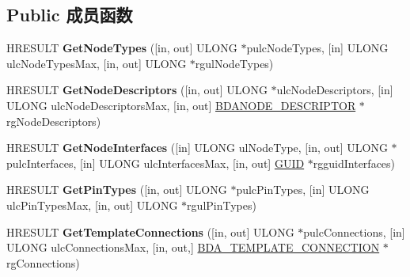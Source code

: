 \subsection*{Public 成员函数}
\begin{DoxyCompactItemize}
\item 
\mbox{\label{interface_i_b_d_a___topology_ac6b2f2dc7c8c6d2a32f9de649b10e5ca}} 
H\+R\+E\+S\+U\+LT {\bfseries Get\+Node\+Types} (\mbox{[}in, out\mbox{]} U\+L\+O\+NG $\ast$pulc\+Node\+Types, \mbox{[}in\mbox{]} U\+L\+O\+NG ulc\+Node\+Types\+Max, \mbox{[}in, out\mbox{]} U\+L\+O\+NG $\ast$rgul\+Node\+Types)
\item 
\mbox{\label{interface_i_b_d_a___topology_afbc9d8c755af710abab9a0173b9b3550}} 
H\+R\+E\+S\+U\+LT {\bfseries Get\+Node\+Descriptors} (\mbox{[}in, out\mbox{]} U\+L\+O\+NG $\ast$ulc\+Node\+Descriptors, \mbox{[}in\mbox{]} U\+L\+O\+NG ulc\+Node\+Descriptors\+Max, \mbox{[}in, out\mbox{]} \hyperlink{struct___b_d_a_n_o_d_e___d_e_s_c_r_i_p_t_o_r}{B\+D\+A\+N\+O\+D\+E\+\_\+\+D\+E\+S\+C\+R\+I\+P\+T\+OR} $\ast$rg\+Node\+Descriptors)
\item 
\mbox{\label{interface_i_b_d_a___topology_a1c13082d196bd894520158fdc1493380}} 
H\+R\+E\+S\+U\+LT {\bfseries Get\+Node\+Interfaces} (\mbox{[}in\mbox{]} U\+L\+O\+NG ul\+Node\+Type, \mbox{[}in, out\mbox{]} U\+L\+O\+NG $\ast$pulc\+Interfaces, \mbox{[}in\mbox{]} U\+L\+O\+NG ulc\+Interfaces\+Max, \mbox{[}in, out\mbox{]} \hyperlink{interface_g_u_i_d}{G\+U\+ID} $\ast$rgguid\+Interfaces)
\item 
\mbox{\label{interface_i_b_d_a___topology_af25b8a5910300b406c1aee632468fe4e}} 
H\+R\+E\+S\+U\+LT {\bfseries Get\+Pin\+Types} (\mbox{[}in, out\mbox{]} U\+L\+O\+NG $\ast$pulc\+Pin\+Types, \mbox{[}in\mbox{]} U\+L\+O\+NG ulc\+Pin\+Types\+Max, \mbox{[}in, out\mbox{]} U\+L\+O\+NG $\ast$rgul\+Pin\+Types)
\item 
\mbox{\label{interface_i_b_d_a___topology_a379db72a2ea23428b2a9b8ef67562861}} 
H\+R\+E\+S\+U\+LT {\bfseries Get\+Template\+Connections} (\mbox{[}in, out\mbox{]} U\+L\+O\+NG $\ast$pulc\+Connections, \mbox{[}in\mbox{]} U\+L\+O\+NG ulc\+Connections\+Max, \mbox{[}in, out,\mbox{]} \hyperlink{struct___b_d_a___t_e_m_p_l_a_t_e___c_o_n_n_e_c_t_i_o_n}{B\+D\+A\+\_\+\+T\+E\+M\+P\+L\+A\+T\+E\+\_\+\+C\+O\+N\+N\+E\+C\+T\+I\+ON} $\ast$rg\+Connections)

\end{DoxyCompactItemize}
